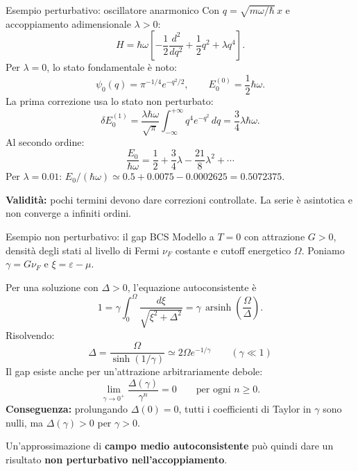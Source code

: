 \begin{frame}{Esempio perturbativo: oscillatore anarmonico}
\small
Con \(q=\sqrt{m\omega/\hbar}\,x\) e accoppiamento
adimensionale \(\lambda>0\):
\[
H=\hbar\omega\left[
-\frac12\frac{d^2}{dq^2}+\frac12q^2+\lambda q^4
\right].
\]
Per \(\lambda=0\), lo stato fondamentale è noto:
\[
\psi_0(q)=\pi^{-1/4}e^{-q^2/2},
\qquad E_0^{(0)}=\frac12\hbar\omega.
\]
La prima correzione usa lo stato non perturbato:
\[
\delta E_0^{(1)}
=\frac{\lambda\hbar\omega}{\sqrt{\pi}}
\int_{-\infty}^{+\infty}q^4e^{-q^2}\,dq
=\frac34\lambda\hbar\omega.
\]
Al secondo ordine:
\[
\boxed{\frac{E_0}{\hbar\omega}
=\frac12+\frac34\lambda-\frac{21}{8}\lambda^2+\cdots}
\]
Per \(\lambda=0.01\): \(E_0/(\hbar\omega)\simeq
0.5+0.0075-0.0002625=0.5072375\).

\medskip
\textbf{Validità:} pochi termini devono dare correzioni controllate.
La serie è asintotica e non converge a infiniti ordini.
\end{frame}


\begin{frame}{Esempio non perturbativo: il gap BCS}
\small
Modello a \(T=0\) con attrazione \(G>0\), densità degli stati
al livello di Fermi \(\nu_F\) costante e cutoff energetico \(\Omega\).
Poniamo \(\gamma=G\nu_F\) e \(\xi=\varepsilon-\mu\).

\medskip
Per una soluzione con \(\Delta>0\), l'equazione autoconsistente è
\[
1=\gamma\int_0^\Omega
\frac{d\xi}{\sqrt{\xi^2+\Delta^2}}
=\gamma\,\operatorname{arsinh}\!
\left(\frac{\Omega}{\Delta}\right).
\]
Risolvendo:
\[
\boxed{
\Delta=\frac{\Omega}{\sinh(1/\gamma)}
\simeq2\Omega e^{-1/\gamma}
\qquad(\gamma\ll1)
}
\]
Il gap esiste anche per un'attrazione arbitrariamente debole:
\[
\lim_{\gamma\to0^+}\frac{\Delta(\gamma)}{\gamma^n}=0
\qquad\text{per ogni }n\geq0.
\]
\textbf{Conseguenza:} prolungando \(\Delta(0)=0\), tutti i
coefficienti di Taylor in \(\gamma\) sono nulli, ma
\(\Delta(\gamma)>0\) per \(\gamma>0\).

\medskip
Un'approssimazione di \textbf{campo medio autoconsistente} può
quindi dare un risultato
\textbf{non perturbativo nell'accoppiamento}.
\end{frame}


